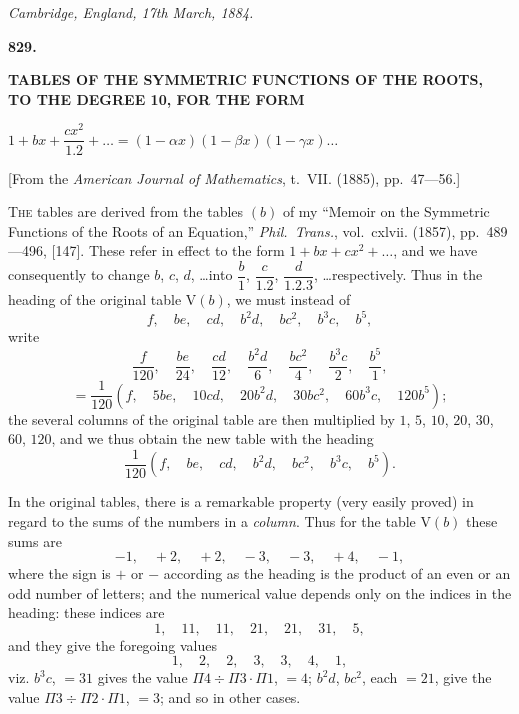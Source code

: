 \documentclass[12pt,a4paper]{article}
\theoremstyle{definition}
\begin{document}
\begin{flushright}
\textit{Cambridge, England, 17th March, 1884.}
\end{flushright}

\newpage
\setcounter{page}{263}


\begin{center}
\Large\textbf{829.}

\bigskip

\Large\textbf{TABLES OF THE SYMMETRIC FUNCTIONS OF THE ROOTS,}\\[0.3em]
\Large\textbf{TO THE DEGREE 10, FOR THE FORM}

\bigskip

\Large$1 + bx + \dfrac{cx^2}{1.2} + \dots = (1 - \alpha x)(1 - \beta x)(1 - \gamma x)\dots$
\end{center}

\begin{center}
[From the \textit{American Journal of Mathematics}, t.~VII. (1885), pp.~47---56.]
\end{center}

\noindent\textsc{The} tables are derived from the tables $(b)$ of my ``Memoir on the Symmetric Functions of the Roots of an Equation,'' \textit{Phil.~Trans.}, vol.~cxlvii. (1857), pp.~489---496, [147]. These refer in effect to the form $1 + bx + cx^2 + \dots$, and we have consequently to change $b$, $c$, $d$, \dots into $\dfrac{b}{1}$, $\dfrac{c}{1.2}$, $\dfrac{d}{1.2.3}$, \dots respectively. Thus in the heading of the original table V$(b)$, we must instead of
\[
f,\quad be,\quad cd,\quad b^2d,\quad bc^2,\quad b^3c,\quad b^5,
\]
write
\[
\frac{f}{120},\quad \frac{be}{24},\quad \frac{cd}{12},\quad \frac{b^2d}{6},\quad \frac{bc^2}{4},\quad \frac{b^3c}{2},\quad \frac{b^5}{1},
\]
\[
= \frac{1}{120}(f,\quad 5be,\quad 10cd,\quad 20b^2d,\quad 30bc^2,\quad 60b^3c,\quad 120b^5);
\]
the several columns of the original table are then multiplied by $1$, $5$, $10$, $20$, $30$, $60$, $120$, and we thus obtain the new table with the heading
\[
\frac{1}{120}(f,\quad be,\quad cd,\quad b^2d,\quad bc^2,\quad b^3c,\quad b^5).
\]

In the original tables, there is a remarkable property (very easily proved) in regard to the sums of the numbers in a \textit{column}. Thus for the table V$(b)$ these sums are
\[
-1,\quad +2,\quad +2,\quad -3,\quad -3,\quad +4,\quad -1,
\]
where the sign is $+$ or $-$ according as the heading is the product of an even or an odd number of letters; and the numerical value depends only on the indices in the heading: these indices are
\[
1,\quad 11,\quad 11,\quad 21,\quad 21,\quad 31,\quad 5,
\]
and they give the foregoing values
\[
1,\quad 2,\quad 2,\quad 3,\quad 3,\quad 4,\quad 1,
\]
viz. $b^3c$, $= 31$ gives the value $\Pi 4 \div \Pi 3 \cdot \Pi 1$, $= 4$; $b^2d$, $bc^2$, each $= 21$, give the value $\Pi 3 \div \Pi 2 \cdot \Pi 1$, $= 3$; and so in other cases.
\end{document}
